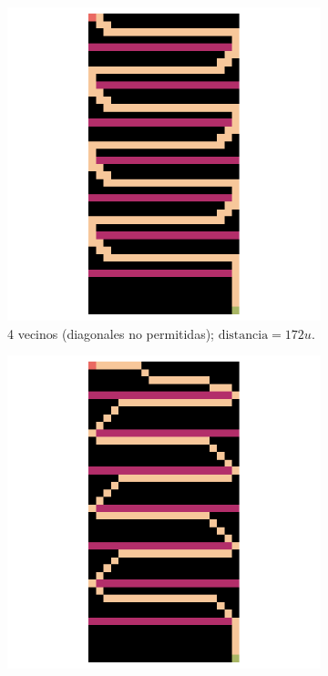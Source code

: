 \begin{enumerate}
\begin{solution}
        \begin{figure}[ht!]
            \centering
            \begin{subfigure}{0.4\textwidth}
                \centering
                \includegraphics[scale=0.3]{../figures/escalera_nodiag.png}
                \caption{4 vecinos (diagonales no permitidas); $\text{distancia} = 172 u$.}
            \end{subfigure}
            \hspace{1cm}
            \begin{subfigure}{0.4\textwidth}
                \centering
                \includegraphics[scale=0.3]{../figures/escalera_diag.png}

\end{subfigure}
\end{figure}
\end{solution}
\end{enumerate}
